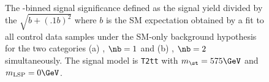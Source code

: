 \begin{figure}[t!]
  \begin{center}
     \\
    \caption{\label{fig:t2cc-best-fit} The \scalht-binned 
      signal significance defined as the signal yield 
      divided by the $\sqrt{b+(.1b)^2}$ where $b$ is the
      SM expectation obtained by a fit to all 
      control data samples under the SM-only background 
      hypothesis for the two categories (a) \njethigh, $\nb = 1$ and (b) 
      \njethigh, $\nb = 2$ simultaneously. 
      The signal model is \texttt{T2tt} with 
      $m_{\st} = 575\GeV$ and $m_{\text{LSP}} = 0\GeV$.} 
  \end{center}
\end{figure}

